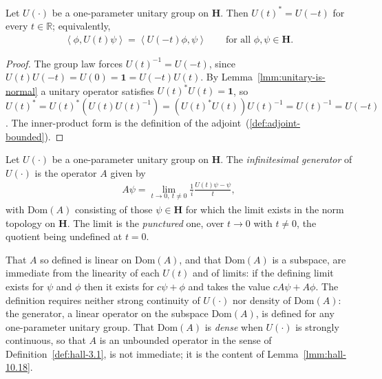 \begin{lemma}
    \label{lmm:unitary-group-inner-adjoint}
    \leanok
    Let $U(\cdot)$ be a one-parameter unitary group on $\mathbf{H}$. Then $U(t)^* = U(-t)$ for every $t \in \mathbb{R}$; equivalently,
    \begin{align}
        \left< \phi, U(t)\psi \right> = \left< U(-t)\phi, \psi \right> \qquad \text{for all } \phi, \psi \in \mathbf{H}.
    \end{align}
\end{lemma}
\begin{proof}
    \leanok
The group law forces $U(t)^{-1} = U(-t)$, since $U(t)U(-t) = U(0) = \mathbf{1} = U(-t)U(t)$. By Lemma~\ref{lmm:unitary-is-normal} a unitary operator satisfies $U(t)^*U(t) = \mathbf{1}$, so $U(t)^* = U(t)^*\left( U(t)U(t)^{-1} \right) = \left( U(t)^*U(t) \right)U(t)^{-1} = U(t)^{-1} = U(-t)$. The inner-product form is the definition of the adjoint~(\ref{def:adjoint-bounded}).
\end{proof}

\begin{definition}
    \label{def:hall-10.13}
    \leanok
    Let $U(\cdot)$ be a one-parameter unitary group on $\mathbf{H}$. The \textit{infinitesimal generator} of $U(\cdot)$ is the operator $A$ given by
    \begin{align}
        A\psi = \lim\limits_{t \rightarrow 0,\ t \ne 0} \frac{1}{i} \frac{U(t)\psi - \psi}{t},
    \end{align}
    with $\text{Dom}(A)$ consisting of those $\psi \in \mathbf{H}$ for which the limit exists in the norm topology on $\mathbf{H}$. The limit is the \textit{punctured} one, over $t \to 0$ with $t \ne 0$, the quotient being undefined at $t = 0$.

    That $A$ so defined is linear on $\text{Dom}(A)$, and that $\text{Dom}(A)$ is a subspace, are immediate from the linearity of each $U(t)$ and of limits: if the defining limit exists for $\psi$ and $\phi$ then it exists for $c\psi + \phi$ and takes the value $cA\psi + A\phi$. The definition requires neither strong continuity of $U(\cdot)$ nor density of $\text{Dom}(A)$: the generator, a linear operator on the subspace $\text{Dom}(A)$, is defined for any one-parameter unitary group. That $\text{Dom}(A)$ is \textit{dense} when $U(\cdot)$ is strongly continuous, so that $A$ is an unbounded operator in the sense of Definition~\ref{def:hall-3.1}, is not immediate; it is the content of Lemma~\ref{lmm:hall-10.18}.
\end{definition}

